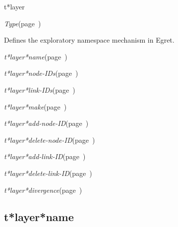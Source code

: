 \begin{description}
\item [Name:]  t*layer

\item [Layer:] {\sl Type}\hfill(page~\pageref{Type})

\item [Description:]

Defines the exploratory namespace mechanism in Egret.

\item [Attributes:]
\item {\sl t*layer*name}\hfill(page~\pageref{t*layer*name})
\item {\sl t*layer*node-IDs}\hfill(page~\pageref{t*layer*node-IDs})
\item {\sl t*layer*link-IDs}\hfill(page~\pageref{t*layer*link-IDs})

\item [Operations:]
\item {\sl t*layer*make}\hfill(page~\pageref{t*layer*make})
\item {\sl t*layer*add-node-ID}\hfill(page~\pageref{t*layer*add-node-ID})
\item {\sl t*layer*delete-node-ID}\hfill(page~\pageref{t*layer*delete-node-ID})
\item {\sl t*layer*add-link-ID}\hfill(page~\pageref{t*layer*add-link-ID})
\item {\sl t*layer*delete-link-ID}\hfill(page~\pageref{t*layer*delete-link-ID})
\item {\sl t*layer*divergence}\hfill(page~\pageref{t*layer*divergence})


\item [Subclasses:]


\item [Superclasses:]


\item [Instances:]
























\end{description}
\horizontalline

\subsection{t*layer*name}
\label{t*layer*name}

